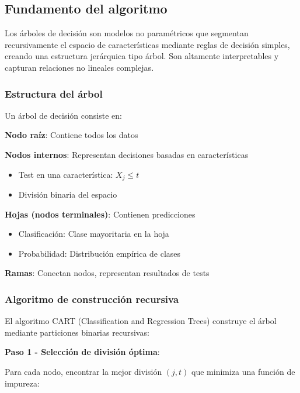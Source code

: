 \documentclass[
  doc,
  floatsintext,
  longtable,
  a4paper,
  nolmodern,
  notxfonts,
  notimes,
  12pt,
  colorlinks=true,linkcolor=blue,citecolor=blue,urlcolor=blue]{apa7}
\providecommand{\tightlist}{%
  \setlength{\itemsep}{0pt}\setlength{\parskip}{0pt}}
\begin{document}
\subsection{Fundamento del algoritmo}\label{fundamento-del-algoritmo-1}

Los árboles de decisión son modelos no paramétricos que segmentan
recursivamente el espacio de características mediante reglas de decisión
simples, creando una estructura jerárquica tipo árbol. Son altamente
interpretables y capturan relaciones no lineales complejas.

\subsubsection{Estructura del árbol}\label{estructura-del-uxe1rbol}

Un árbol de decisión consiste en:

\textbf{Nodo raíz}: Contiene todos los datos

\textbf{Nodos internos}: Representan decisiones basadas en
características

\begin{itemize}
\tightlist
\item
  Test en una característica: \(X_j \leq t\)
\item
  División binaria del espacio
\end{itemize}

\textbf{Hojas (nodos terminales)}: Contienen predicciones

\begin{itemize}
\tightlist
\item
  Clasificación: Clase mayoritaria en la hoja
\item
  Probabilidad: Distribución empírica de clases
\end{itemize}

\textbf{Ramas}: Conectan nodos, representan resultados de tests

\subsubsection{Algoritmo de construcción
recursiva}\label{algoritmo-de-construcciuxf3n-recursiva}

El algoritmo CART (Classification and Regression Trees) construye el
árbol mediante particiones binarias recursivas:

\textbf{Paso 1 - Selección de división óptima}:

Para cada nodo, encontrar la mejor división \((j, t)\) que minimiza una
función de impureza:
\end{document}
